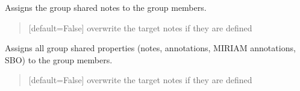 \documentclass[letterpaper,12pt,english]{sphinxmanual}
\begin{document}
\begin{fulllineitems}
\begin{fulllineitems}
\begin{quote}
\begin{description}
\end{description}\end{quote}

\end{fulllineitems}


\begin{fulllineitems}
\label{\detokenize{api/core:cbmpy.CBModel.Group.assignSharedNotesToMembers}}
\pysigstartsignatures
\pysiglinewithargsret
{}
{}
{}
\pysigstopsignatures
\sphinxAtStartPar
Assigns the group shared notes to the group members.
\begin{quote}\begin{description}
\sphinxAtStartPar
{} \textendash{} {[}default=False{]} overwrite the target notes if they are defined

\end{description}\end{quote}

\end{fulllineitems}


\begin{fulllineitems}
\label{\detokenize{api/core:cbmpy.CBModel.Group.assignAllSharedPropertiesToMembers}}
\pysigstartsignatures
\pysiglinewithargsret
{}
{}
{}
\pysigstopsignatures
\sphinxAtStartPar
Assigns all group shared properties (notes, annotations, MIRIAM annotations, SBO) to the group members.
\begin{quote}\begin{description}
\sphinxAtStartPar
{} \textendash{} {[}default=False{]} overwrite the target notes if they are defined

\end{description}\end{quote}


\end{fulllineitems}
\end{fulllineitems}
\end{document}
